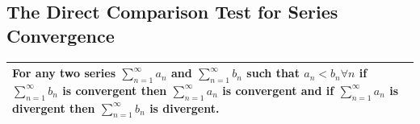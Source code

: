 \documentclass[12pt]{article}
\begin{document}
\begin{center}
\subsection*{\textbf{The Direct Comparison Test for Series Convergence}}
\begin{tabular}{ | p{\textwidth} |}
    \hline
    For any two series \( \displaystyle\sum_{n = 1}^{\infty} { a_n } \) and \( \displaystyle\sum_{n = 1}^{\infty} { b_n } \) such that \( a_n < b_n \forall n \) 
    if \( \displaystyle\sum_{n = 1}^{\infty} { b_n } \) is convergent then \( \displaystyle\sum_{n = 1}^{\infty} { a_n } \) is convergent and if 
    \( \displaystyle\sum_{n = 1}^{\infty} { a_n } \) is divergent then \( \displaystyle\sum_{n = 1}^{\infty} { b_n } \) is divergent.
    \\ \hline
\end{tabular}

\subsection*{\textbf{}}
\begin{tabular}{ | p{\textwidth} |}
    \hline
    
    \\ \hline
\end{tabular}


\end{center}
\end{document}
